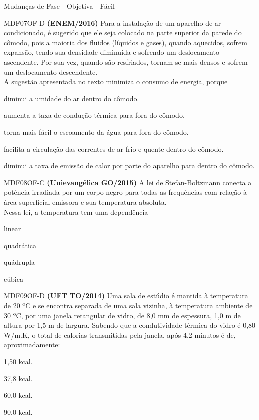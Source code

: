 \documentclass[12pt]{article}
\begin{document}
\begin{quiz}{Mudanças de Fase - Objetiva - Fácil}
		\begin{multi}[points=1,penalty=0]{MDF07OF-D}
			\textbf{(ENEM/2016)} Para a instalação de um aparelho de ar-condicionado, é sugerido que ele seja colocado na parte superior da parede do cômodo, pois a maioria dos fluidos (líquidos e gases), quando aquecidos, sofrem expansão, tendo sua densidade diminuída e sofrendo um deslocamento ascendente. Por sua vez, quando são resfriados, tornam-se mais densos e sofrem um deslocamento descendente.\\			
			A sugestão apresentada no texto minimiza o consumo de energia, porque				
			\item diminui a umidade do ar dentro do cômodo.
			\item aumenta a taxa de condução térmica para fora do cômodo.
			\item torna mais fácil o escoamento da água para fora do cômodo.
			\item* facilita a circulação das correntes de ar frio e quente dentro do cômodo.
			\item diminui a taxa de emissão de calor por parte do aparelho para dentro do cômodo.
		\end{multi}
		\begin{multi}[points=1,penalty=0]{MDF08OF-C}
			\textbf{(Unievangélica GO/2015)} A lei de Stefan-Boltzmann conecta a potência irradiada por um corpo negro para todas as frequências com relação à área superficial emissora e sua temperatura absoluta.\\			
			Nessa lei, a temperatura tem uma dependência						
			\item linear
			\item quadrática
			\item* quádrupla
			\item cúbica
		\end{multi}
		\begin{multi}[points=1,penalty=0]{MDF09OF-D}
			\textbf{(UFT TO/2014)} Uma sala de estúdio é mantida à temperatura de 20 ºC e se encontra separada de uma sala vizinha, à temperatura ambiente de 30 ºC, por uma janela retangular de vidro, de 8,0 mm de espessura, 1,0 m de altura por 1,5 m de largura. Sabendo que a condutividade térmica do vidro é 0,80 W/m.K, o total de calorias transmitidas pela janela, após 4,2 minutos é de, aproximadamente:								
			\item 1,50 kcal.
			\item 37,8 kcal.
			\item 60,0 kcal.
			\item* 90,0 kcal.

\end{multi}
\end{quiz}
\end{document}
